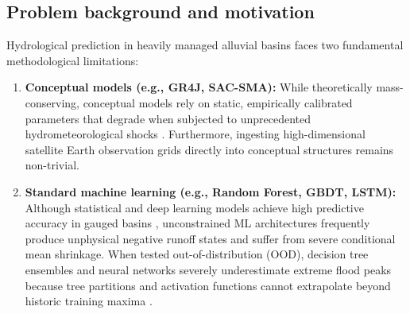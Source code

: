 \documentclass[11pt,a4paper,fleqn]{article}
\begin{document}
\subsection{Problem background and motivation}
Hydrological prediction in heavily managed alluvial basins faces two fundamental methodological limitations:
\begin{enumerate}
    \item \textbf{Conceptual models (e.g., GR4J, SAC-SMA):} While theoretically mass-conserving, conceptual models rely on static, empirically calibrated parameters that degrade when subjected to unprecedented hydrometeorological shocks \citep{frame2022post, gupta2009decomposition, perrin2003improvement}. Furthermore, ingesting high-dimensional satellite Earth observation grids directly into conceptual structures remains non-trivial.
    \item \textbf{Standard machine learning (e.g., Random Forest, GBDT, LSTM):} Although statistical and deep learning models achieve high predictive accuracy in gauged basins \citep{kratzert2018rainfall, kratzert2019towards, nearing2024global}, unconstrained ML architectures frequently produce unphysical negative runoff states and suffer from severe conditional mean shrinkage. When tested out-of-distribution (OOD), decision tree ensembles and neural networks severely underestimate extreme flood peaks because tree partitions and activation functions cannot extrapolate beyond historic training maxima \citep{jia2021physics, karpatne2017physics, read2019process}.
\end{enumerate}
\end{document}
